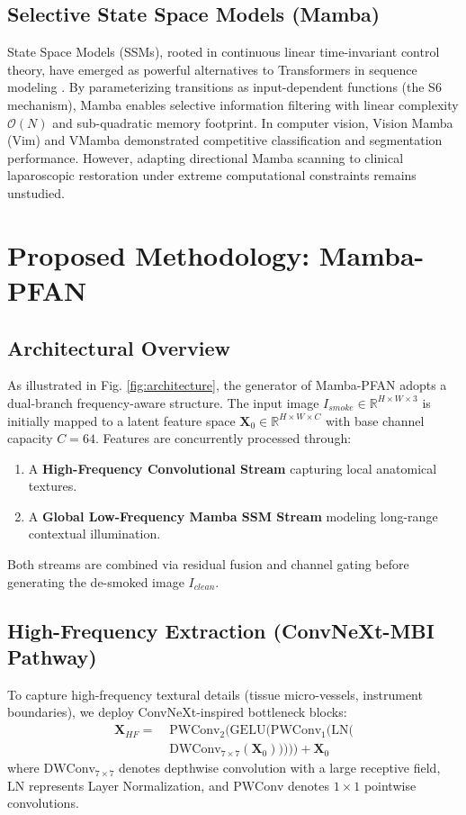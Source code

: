\documentclass[conference]{IEEEtran}
\begin{document}
\subsection{Selective State Space Models (Mamba)}
State Space Models (SSMs), rooted in continuous linear time-invariant control theory, have emerged as powerful alternatives to Transformers in sequence modeling \cite{gu2023mamba}. By parameterizing transitions as input-dependent functions (the S6 mechanism), Mamba enables selective information filtering with linear complexity $\mathcal{O}(N)$ and sub-quadratic memory footprint. In computer vision, Vision Mamba (Vim) \cite{zhu2024visionmamba} and VMamba \cite{liu2024vmamba} demonstrated competitive classification and segmentation performance. However, adapting directional Mamba scanning to clinical laparoscopic restoration under extreme computational constraints remains unstudied.

\section{Proposed Methodology: Mamba-PFAN}

\subsection{Architectural Overview}
As illustrated in Fig. \ref{fig:architecture}, the generator of Mamba-PFAN adopts a dual-branch frequency-aware structure. The input image $I_{smoke} \in \mathbb{R}^{H \times W \times 3}$ is initially mapped to a latent feature space $\mathbf{X}_0 \in \mathbb{R}^{H \times W \times C}$ with base channel capacity $C = 64$. Features are concurrently processed through:
\begin{enumerate}
    \item A \textbf{High-Frequency Convolutional Stream} capturing local anatomical textures.
    \item A \textbf{Global Low-Frequency Mamba SSM Stream} modeling long-range contextual illumination.
\end{enumerate}
Both streams are combined via residual fusion and channel gating before generating the de-smoked image $I_{clean}$.

\subsection{High-Frequency Extraction (ConvNeXt-MBI Pathway)}
To capture high-frequency textural details (tissue micro-vessels, instrument boundaries), we deploy ConvNeXt-inspired bottleneck blocks:
\begin{equation}
\begin{split}
\mathbf{X}_{HF} = &\;\text{PWConv}_2\big(\text{GELU}\big(\text{PWConv}_1\big(\text{LN}\big( \\
&\;\text{DWConv}_{7\times 7}(\mathbf{X}_0)\big)\big)\big)\big) + \mathbf{X}_0
\end{split}
\end{equation}
where $\text{DWConv}_{7\times 7}$ denotes depthwise convolution with a large receptive field, $\text{LN}$ represents Layer Normalization, and $\text{PWConv}$ denotes $1 \times 1$ pointwise convolutions.
\end{document}
